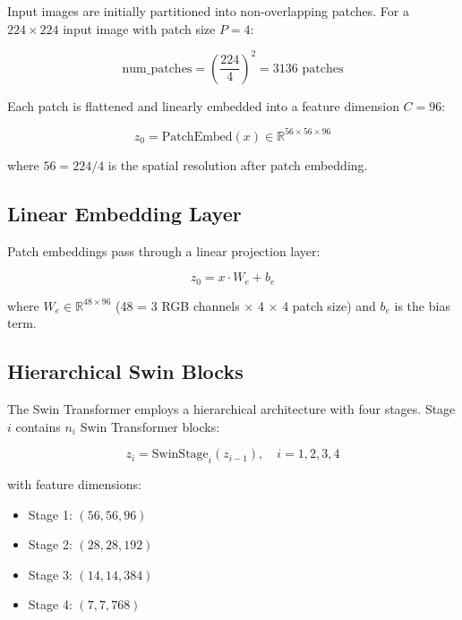 Input images are initially partitioned into non-overlapping patches. For a $224 \times 224$ input image with patch size $P = 4$:

\begin{equation}
\text{num\_patches} = \left(\frac{224}{4}\right)^2 = 3136 \text{ patches}
\end{equation}

Each patch is flattened and linearly embedded into a feature dimension $C = 96$:

\begin{equation}
z_0 = \text{PatchEmbed}(x) \in \mathbb{R}^{56 \times 56 \times 96}
\end{equation}

where $56 = 224 / 4$ is the spatial resolution after patch embedding.

\subsection{Linear Embedding Layer}

Patch embeddings pass through a linear projection layer:

\begin{equation}
z_0 = x \cdot W_e + b_e
\end{equation}

where $W_e \in \mathbb{R}^{48 \times 96}$ (48 = 3 RGB channels $\times$ 4 $\times$ 4 patch size) and $b_e$ is the bias term.

\subsection{Hierarchical Swin Blocks}

The Swin Transformer employs a hierarchical architecture with four stages. Stage $i$ contains $n_i$ Swin Transformer blocks:

\begin{equation}
z_i = \text{SwinStage}_i(z_{i-1}), \quad i = 1, 2, 3, 4
\end{equation}

with feature dimensions:
\begin{itemize}
    \item Stage 1: $(56, 56, 96)$
    \item Stage 2: $(28, 28, 192)$
    \item Stage 3: $(14, 14, 384)$
    \item Stage 4: $(7, 7, 768)$
\end{itemize}

